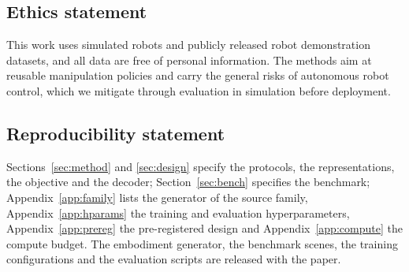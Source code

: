 \subsection*{Ethics statement}
This work uses simulated robots and publicly released robot demonstration datasets, and all data are free of personal information. The methods aim at reusable manipulation policies and carry the general risks of autonomous robot control, which we mitigate through evaluation in simulation before deployment.

\subsection*{Reproducibility statement}
Sections~\ref{sec:method} and \ref{sec:design} specify the protocols, the representations, the objective and the decoder; Section~\ref{sec:bench} specifies the benchmark; Appendix~\ref{app:family} lists the generator of the source family, Appendix~\ref{app:hparams} the training and evaluation hyperparameters, Appendix~\ref{app:prereg} the pre-registered design and Appendix~\ref{app:compute} the compute budget. The embodiment generator, the benchmark scenes, the training configurations and the evaluation scripts are released with the paper.
